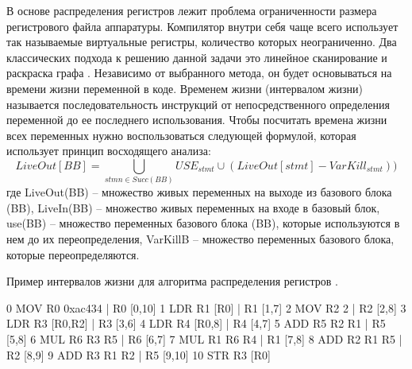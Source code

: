 В основе распределения регистров лежит проблема  ограниченности размера регистрового файла аппаратуры. Компилятор внутри себя чаще всего использует так называемые виртуальные регистры, количество которых неограниченно. Два классических подхода к решению данной задачи это линейное сканирование \cite{poletto1999linear, subha2009modified} и раскраска графа \cite{smith2004generalized, briggs1992register}. 
Независимо от выбранного метода, он будет основываться на времени жизни переменной в коде. Временем жизни (интервалом жизни) называется последовательность инструкций от непосредственного определения переменной до ее последнего использования. Чтобы посчитать времена жизни всех переменных нужно воспользоваться следующей формулой, которая использует принцип восходящего анализа:
$$LiveOut[BB] = \bigcup_{stmn \in Succ(BB)}{USE_{stmt} \cup (LiveOut[stmt] - VarKill_{stmt}))}$$
где LiveOut(BB) – множество живых переменных на выходе из базового блока (BB),
LiveIn(BB) – множество живых переменных  на входе в базовый блок,
use(BB) – множество переменных базового блока (BB), которые используются
в нем до их переопределения,
VarKillB – множество переменных базового блока, которые
переопределяются.

\begin{ListingEnv}[!h]
	\captiondelim{ } 
	\caption{Пример интервалов жизни для алгоритма распределения регистров \cite{melnik2010case}.}\label{partReview:regalloc5}
	
	\begin{Verb}
		0 MOV R0 0xac434   | R0 [0,10]
		1 LDR R1 [R0]      | R1 [1,7]
		2 MOV R2 2         | R2 [2,8]
		3 LDR R3 [R0,R2]   | R3 [3,6]
		4 LDR R4 [R0,8]    | R4 [4,7]
		5 ADD R5 R2 R1     | R5 [5,8]
		6 MUL R6 R3 R5     | R6 [6,7]
		7 MUL R1 R6 R4     | R1 [7,8]
		8 ADD R2 R1 R5     | R2 [8,9]
		9 ADD R3 R1 R2     | R5 [9,10]
		10 STR R3 [R0]     
	\end{Verb}
\end{ListingEnv}


